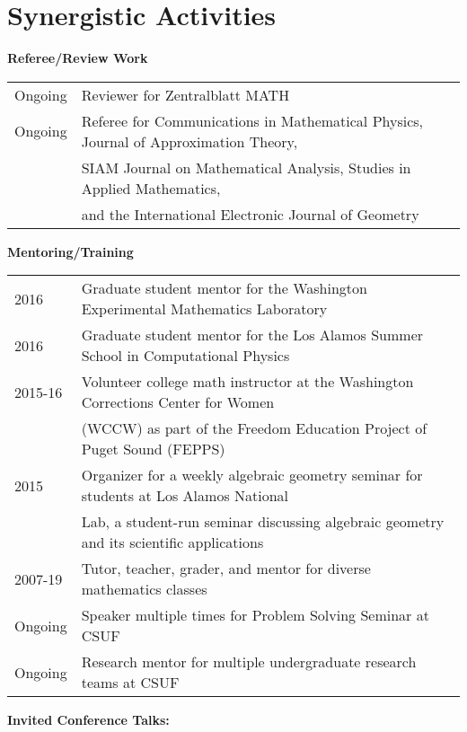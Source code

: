 \documentclass[12pt,letterpaper]{article}
\theoremstyle{definition}
\begin{document}
\section{Synergistic Activities}\mbox{}
\begin{center}
\textbf{Referee/Review Work}
\end{center}
\begin{tabular}{ll}
Ongoing & Reviewer for Zentralblatt MATH\\
Ongoing & Referee for Communications in Mathematical Physics, Journal of Approximation Theory,\\
        & SIAM Journal on Mathematical Analysis, Studies in Applied Mathematics,\\
	& and the International Electronic Journal of Geometry
\end{tabular}
\begin{center}
\textbf{Mentoring/Training}
\end{center}
\begin{tabular}{ll}
2016 & Graduate student mentor for the Washington Experimental Mathematics Laboratory\\
2016 & Graduate student mentor for the Los Alamos Summer School in Computational Physics\\
2015-16 & Volunteer college math instructor at the Washington Corrections Center for Women\\
 & (WCCW) as part of the Freedom Education Project of Puget Sound (FEPPS)\\
2015 & Organizer for a weekly algebraic geometry seminar for students at Los Alamos National\\
 & Lab, a student-run seminar discussing algebraic geometry and its scientific applications\\
2007-19 & Tutor, teacher, grader, and mentor for diverse mathematics classes\\
Ongoing & Speaker multiple times for Problem Solving Seminar at CSUF\\
Ongoing & Research mentor for multiple undergraduate research teams at CSUF
\end{tabular}
\begin{center}
\textbf{Invited Conference Talks:}
\end{center}
\end{document}
